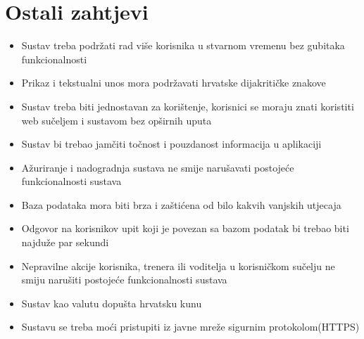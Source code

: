 				
				
				\eject
	            
	            
	            
		\section{Ostali zahtjevi}
		
			\begin{itemize}
	        	\item 	Sustav treba podržati rad više korisnika u stvarnom vremenu bez gubitaka funkcionalnosti
	        	\item 	Prikaz i tekstualni unos mora podržavati hrvatske dijakritičke znakove
	        	\item 	Sustav treba biti jednostavan za korištenje, korisnici se moraju znati koristiti web sučeljem i sustavom bez opširnih uputa 
	        	\item 	Sustav bi trebao jamčiti točnost i pouzdanost informacija u aplikaciji
	        	\item 	Ažuriranje i nadogradnja sustava ne smije narušavati postojeće funkcionalnosti sustava
	        	\item 	Baza podataka mora biti brza i zaštićena od bilo kakvih vanjskih utjecaja
	        	\item 	Odgovor na korisnikov upit koji je povezan sa bazom podatak bi trebao biti najduže par sekundi
	        	\item 	Nepravilne akcije korisnika, trenera ili voditelja u korisničkom sučelju ne smiju narušiti postojeće funkcionalnosti sustava
	        	\item 	Sustav kao valutu dopušta hrvatsku kunu
	        	\item 	Sustavu se treba moći pristupiti iz javne mreže sigurnim protokolom(HTTPS)
        	\end{itemize}
